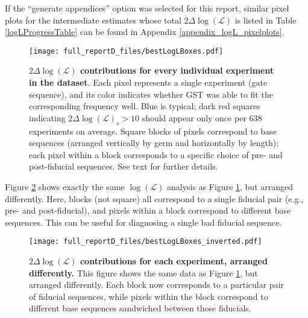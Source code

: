 \documentclass{article}[11pt]
\begin{document}
{If the ``generate appendices'' option was selected for this report, similar pixel plots for the intermediate estimates whose total $2\Delta\log(\mathcal{L})$ is listed in Table \ref{logLProgressTable} can be found in Appendix \ref{appendix_logL_pixelplots}.

\begin{figure}
\begin{center}
\texttt{[image: full\_reportD\_files/bestLogLBoxes.pdf]}
\caption{\textbf{$2\Delta\log(\mathcal{L})$ contributions for every individual experiment in the dataset}.  Each pixel represents a single experiment (gate sequence), and its color indicates whether GST was able to fit the corresponding frequency well.  Blue is typical; dark red squares indicating $2\Delta\log(\mathcal{L})_s>10$ should appear only once per 638 experiments on average.  Square blocks of pixels correspond to base sequences (arranged vertically by germ and horizontally by length); each pixel within a block corresponds to a specific choice of pre- and post-fiducial sequences.  See text for further details.\label{bestGatesetLogLBoxPlot}}
\end{center}
\end{figure}

Figure \ref{bestGatesetLogLInvBoxPlot} shows exactly the same $\log(\mathcal{L})$ analysis as Figure \ref{bestGatesetLogLBoxPlot}, but arranged differently.  Here, blocks (not square) all correspond to a single fiducial pair (e.g., pre- and post-fiducial), and pixels within a block correspond to different base sequences.  This can be useful for diagnosing a single bad fiducial sequence.

\begin{figure}
\begin{center}
\texttt{[image: full\_reportD\_files/bestLogLBoxes\_inverted.pdf]}
\caption{\textbf{$2\Delta\log(\mathcal{L})$ contributions for each experiment, arranged differently.}  This figure shows the same data as Figure \ref{bestGatesetLogLBoxPlot}, but arranged differently.  Each block now corresponds to a particular pair of fiducial sequences, while pixels within the block correspond to different base sequences sandwiched between those fiducials.\label{bestGatesetLogLInvBoxPlot}}
\end{center}
\end{figure}

}{}


\end{document}
